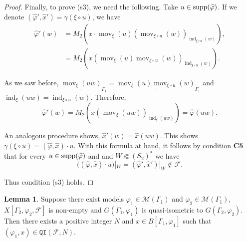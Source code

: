 \documentclass{article}
\theoremstyle{definition}
\newtheorem{lemma}[theorem]{Lemma}
\theoremstyle{definition}
\newcommand{\M}{\mathcal{M}}
\newcommand{\Fo}{\mathcal{F}}
\newcommand{\QI}{\mathtt{QI}}
\newcommand{\mov}{\operatorname{mov}}
\newcommand{\ind}{\operatorname{ind}}
\newcommand{\supp}{\textnormal{supp}}
\begin{document}
\begin{proof}
Finally, to prove (s3), we need the following. Take $u\in \supp(\widehat{\varphi})$. If we denote $(\widehat{\varphi}',\widehat{x}') = \gamma(\xi\circ u)$, we have
\begin{align*}
    \widehat{\varphi}'(w) &= M_2(x\cdot\mov_{\xi}(u)(\mov_{{\xi}\circ u}(w))_{\ind_{{\xi}\circ u}(w)}),\\
    &= M_2(x(\mov_{\xi}(u)\mov_{{\xi}\circ u}(w))_{\ind_{{\xi}\circ u}(w)}).
\end{align*}

As we saw before, $\underline{\mov_{\xi}(uw)}_{\Gamma_1} = \underline{\mov_{\xi}(u)\mov_{{\xi}\circ u}(w)}_{\Gamma_1}$ and $\ind_{\xi}(uw) = \ind_{{\xi}\circ u}(w)$. Therefore,
\[\widehat{\varphi}'(w) = M_2(x(\mov_{\xi}(uw))_{\ind_{\xi}(uw)}) = \widehat{\varphi}(uw).\]

An analogous procedure shows, $\widehat{x}'(w) = \widehat{x}(uw)$. This shows $\gamma(\xi \circ u) = (\widehat{\varphi},\widehat{x})\cdot u$. With this formula at hand, it follows by  condition \textbf{C5} that for every $u\in \supp(\widehat{\varphi})$ and and $W\Subset (S_2)^*$ we have \[\bigl((\widehat{\varphi},\widehat{x})\cdot u\bigr)|_{W} = (\widehat{\varphi}',\widehat{x}')|_W \notin\Fo.   \]

Thus condition (s3) holds.
\end{proof}



%

\begin{lemma}
\label{lem:ida}
    Suppose there exist models $\varphi_1\in\M(\Gamma_1)$ and $\varphi_2\in\M(\Gamma_1)$, $X[\Gamma_2, \varphi_2, \Fo]$ is non-empty and $G(\Gamma_1, \varphi_1)$ is quasi-isometric to $G(\Gamma_2,\varphi_2)$. Then there exists a positive integer $N$ and $x \in B[\Gamma_1, {\varphi_1}]$ such that $(\varphi_1,x) \in \QI(\Fo,N)$.
\end{lemma}
\end{document}
